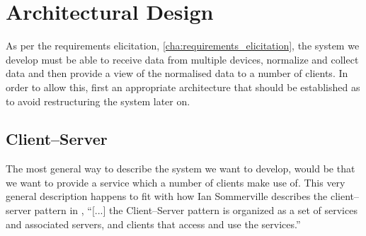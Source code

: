 





\chapter{Architectural Design}\label{cha:architectural_design}
As per the requirements elicitation, \cref{cha:requirements_elicitation}, the system we develop must be able to receive data from multiple devices, normalize and collect data and then provide a view of the normalised data to a number of clients.
In order to allow this, first an appropriate architecture that should be established as to avoid restructuring the system later on.

\section{Client--Server}
The most general way to describe the system we want to develop, would be that we want to provide a service which a number of clients make use of.
This very general description happens to fit with how Ian Sommerville describes the client--server pattern in \cite{software_engineering},
``[...] the Client--Server pattern is organized as a set of services and associated servers, and clients that access and use the services.''

